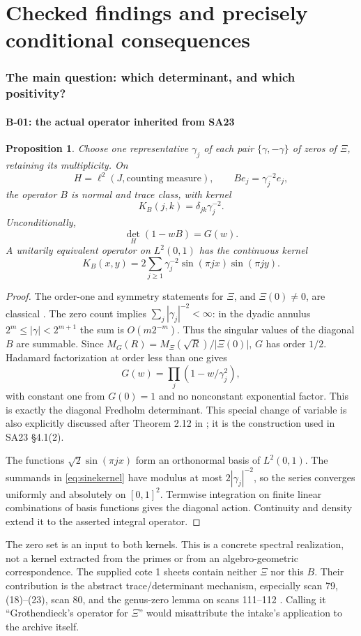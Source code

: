 \documentclass[11pt,a4paper]{article}
\newtheorem*{proposition}{Proposition}
\begin{document}
\clearpage
\part{Checked findings and precisely conditional consequences}
\section{The main question: which determinant, and which positivity?}
\subsection{B-01: the actual operator inherited from SA23}
\begin{proposition}
Choose one representative $\gamma_j$ of each pair $\{\gamma,-\gamma\}$ of zeros of $\Xi$, retaining its multiplicity. On
\[
 H=\ell^2(J,\text{counting measure}),\qquad
 B e_j=\gamma_j^{-2}e_j,
\]
the operator $B$ is normal and trace class, with kernel
\[
 K_B(j,k)=\delta_{jk}\gamma_j^{-2}.
\]
Unconditionally,
\begin{equation}\label{eq:Bdet}
 \det_H(1-wB)=G(w).
\end{equation}
A unitarily equivalent operator on $L^2(0,1)$ has the continuous kernel
\begin{equation}\label{eq:sinekernel}
 K_B(x,y)=2\sum_{j\ge1}\gamma_j^{-2}\sin(\pi jx)\sin(\pi jy).
\end{equation}
\end{proposition}
\begin{proof}
The order-one and symmetry statements for $\Xi$, and $\Xi(0)\ne0$, are classical \cite[Theorem 2.12 and (2.12.4), pp.~29--30]{titch}. The zero count implies $\sum_j|\gamma_j|^{-2}<\infty$: in the dyadic annulus $2^m\le|\gamma|<2^{m+1}$ the sum is $O(m2^{-m})$. Thus the singular values of the diagonal $B$ are summable. Since
$M_G(R)=M_\Xi(\sqrt R)/|\Xi(0)|$, $G$ has order $1/2$. Hadamard factorization \cite[Theorem 3.16, p.~92]{mcmullen} at order less than one gives
\[
 G(w)=\prod_j(1-w/\gamma_j^2),
\]
with constant one from $G(0)=1$ and no nonconstant exponential factor. This is exactly the diagonal Fredholm determinant. This special change of variable is also explicitly discussed after Theorem 2.12 in \cite[p.~30]{titch}; it is the construction used in SA23 \S4.1(2).

The functions $\sqrt2\sin(\pi jx)$ form an orthonormal basis of $L^2(0,1)$. The summands in \eqref{eq:sinekernel} have modulus at most $2|\gamma_j|^{-2}$, so the series converges uniformly and absolutely on $[0,1]^2$. Termwise integration on finite linear combinations of basis functions gives the diagonal action. Continuity and density extend it to the asserted integral operator.
\end{proof}
The zero set is an input to both kernels. This is a concrete spectral realization, not a kernel extracted from the primes or from an algebro-geometric correspondence. The supplied cote 1 sheets contain neither $\Xi$ nor this $B$. Their contribution is the abstract trace/determinant mechanism, especially scan 79, (18)--(23), scan 80, and the genus-zero lemma on scans 111--112 \cite{archive}. Calling it ``Grothendieck's operator for $\Xi$'' would misattribute the intake's application to the archive itself.
\end{document}
